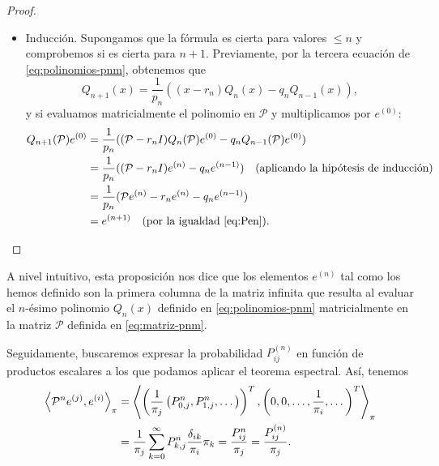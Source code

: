 \begin{proof}
\begin{itemize}
            \item Inducción. Supongamos que la fórmula es cierta para valores $\leq n$ y comprobemos si es cierta para $n+1$. Previamente, por la tercera ecuación de \eqref{eq:polinomios-pnm}, obtenemos que 
            $$
            Q_{n+1}(x) = \dfrac{1}{p_n}((x-r_n)Q_n(x)-q_n Q_{n-1}(x)),
            $$
            y si evaluamos matricialmente el polinomio en $\mathcal{P}$ y multiplicamos por $e^{(0)}$:
            \begin{equation*}
                \begin{split}
                    Q_{n+1}(\mathcal{P})e^{(0)} &= \dfrac{1}{p_n}((\mathcal{P}-r_n I)Q_n(\mathcal{P})e^{(0)}-q_n Q_{n-1}(\mathcal{P})e^{(0)}) \\
                    &= \dfrac{1}{p_n}((\mathcal{P}-r_n I)e^{(n)}-q_n e^{(n-1)}) \ \  \ \text{(aplicando la hipótesis de inducción)} \\
                    &= \dfrac{1}{p_n}(\mathcal{P}e^{(n)} -r_n e^{(n)}-q_n e^{(n-1)}) \\
                    &= e^{(n+1)} \ \ \ \text{(por la igualdad \eqref{eq:Pen})}.
                \end{split}
            \end{equation*}
        \end{itemize}
    \end{proof}

    A nivel intuitivo, esta proposición nos dice que los elementos $e^{(n)}$ tal como los hemos definido son la primera columna de la matriz infinita que resulta al evaluar el $n$-ésimo polinomio $Q_n(x)$ definido en \eqref{eq:polinomios-pnm} matricialmente en la matriz $\mathcal{P}$ definida en \eqref{eq:matriz-pnm}.

    Seguidamente, buscaremos expresar la probabilidad $P_{ij}^{(n)}$ en función de productos escalares a los que podamos aplicar el teorema espectral. Así, tenemos
    \begin{equation*}
        \begin{split}
            \left\langle \mathcal{P}^n e^{(j)} , e^{(i)} \right\rangle_\pi &= \left\langle \left(\dfrac{1}{\pi_j}\left(P^n_{0,j},P^n_{1,j},\dots\right)\right)^T , \left(0,0,\dots, \dfrac{1}{\pi_i},\dots \right)^T \right\rangle_\pi \\
            &= \dfrac{1}{\pi_j} \sum_{k=0}^\infty P^n_{k,j} \dfrac{\delta_{ik}}{\pi_i}\pi_k = \dfrac{P^n_{ij}}{\pi_j}=\dfrac{P^{(n)}_{ij}}{\pi_j}.
        \end{split}
    \end{equation*}

